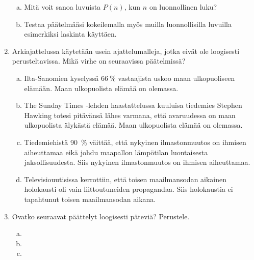 \begin{enumerate}
\begin{enumerate}[a)]
            \item Mitä voit sanoa luvuista $P(n)$, kun $n$ on luonnollinen luku?
            \item Testaa päätelmääsi kokeilemalla myös muilla luonnollisilla luvuilla esimerkiksi laskinta käyttäen.
        \end{enumerate}
    \item Arkiajattelussa käytetään usein ajattelumalleja, jotka eivät ole loogisesti perusteltavissa.
        Mikä virhe on seuraavissa päätelmissä?
        \begin{enumerate}[a)]
            \item Ilta-Sanomien kyselyssä $66~\%$ vastaajista uskoo maan ulkopuoliseen elämään.
                Maan ulkopuolista elämää on olemassa.
            \item The Sunday Times -lehden haastattelussa kuuluisa tiedemies Stephen Hawking
                totesi pitävänsä lähes varmana, että avaruudessa on maan ulkopuolista älykästä elämää.
                Maan ulkopuolista elämää on olemassa.
            \item Tiedemiehistä 90~\% väittää, että nykyinen ilmastonmuutos on ihmisen aiheuttamaa
                eikä johdu maapallon lämpötilan luontaisesta jaksollisuudesta.
                Siis nykyinen ilmastonmuutos on ihmisen aiheuttamaa.
            \item Televisiouutisissa kerrottiin, että toisen maailmansodan aikainen holokausti oli
                vain liittoutuneiden propagandaa.
                Siis holokaustia ei tapahtunut toisen maailmansodan aikana.
        \end{enumerate}
    \item Ovatko seuraavat päättelyt loogisesti päteviä? Perustele.
        \begin{enumerate}[a)]
            \item {}
            \item {}
            \item {}
        \end{enumerate}
\end{enumerate}

